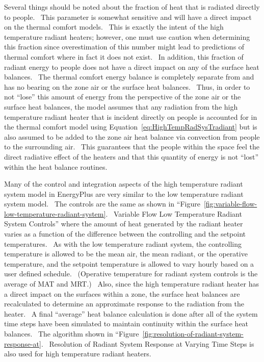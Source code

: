 {Several things should be noted about the fraction of heat that is radiated directly to people.~ This parameter is somewhat sensitive and will have a direct impact on the thermal comfort models.~ This is exactly the intent of the high temperature radiant heaters; however, one must use caution when determining this fraction since overestimation of this number might lead to predictions of thermal comfort where in fact it does not exist.~ In addition, this fraction of radiant energy to people does not have a direct impact on any of the surface heat balances.~ The thermal comfort energy balance is completely separate from and has no bearing on the zone air or the surface heat balances.~ Thus, in order to not ``lose'' this amount of energy from the perspective of the zone air or the surface heat balances, the model assumes that any radiation from the high temperature radiant heater that is incident directly on people is accounted for in the thermal comfort model using Equation~\ref{eq:HighTempRadSysTradiant} but is also assumed to be added to the zone air heat balance via convection from people to the surrounding air.~ This guarantees that the people within the space feel the direct radiative effect of the heaters and that this quantity of energy is not ``lost'' within the heat balance routines.

Many of the control and integration aspects of the high temperature radiant system model in EnergyPlus are very similar to the low temperature radiant system model.~ The controls are the same as shown in ``Figure~\ref{fig:variable-flow-low-temperature-radiant-system}.~ Variable Flow Low Temperature Radiant System Controls'' where the amount of heat generated by the radiant heater varies as a function of the difference between the controlling and the setpoint temperatures.~ As with the low temperature radiant system, the controlling temperature is allowed to be the mean air, the mean radiant, or the operative temperature, and the setpoint temperature is allowed to vary hourly based on a user defined schedule.~ (Operative temperature for radiant system controls is the average of MAT and MRT.)~ Also, since the high temperature radiant heater has a direct impact on the surfaces within a zone, the surface heat balances are recalculated to determine an approximate response to the radiation from the heater.~ A final ``average'' heat balance calculation is done after all of the system time steps have been simulated to maintain continuity within the surface heat balances.~ The algorithm shown in ``Figure~\ref{fig:resolution-of-radiant-system-response-at}.~ Resolution of Radiant System Response at Varying Time Steps is also used for high temperature radiant heaters.

}
